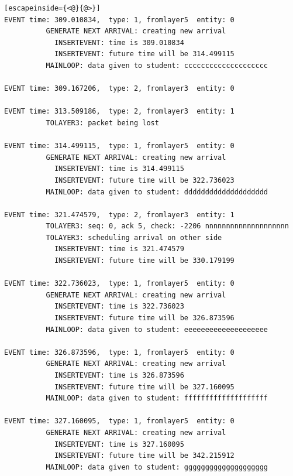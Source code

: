 \documentclass[paper=a4, fontsize=11pt]{scrartcl}
\numberwithin{equation}{section}		%
\numberwithin{figure}{section}			%
\numberwithin{table}{section}				%
\begin{document}
\begin{lstlisting}[escapeinside={<@}{@>}]
EVENT time: 309.010834,  type: 1, fromlayer5  entity: 0
          GENERATE NEXT ARRIVAL: creating new arrival
            INSERTEVENT: time is 309.010834
            INSERTEVENT: future time will be 314.499115
          MAINLOOP: data given to student: cccccccccccccccccccc

EVENT time: 309.167206,  type: 2, fromlayer3  entity: 0

EVENT time: 313.509186,  type: 2, fromlayer3  entity: 1
          TOLAYER3: packet being lost

EVENT time: 314.499115,  type: 1, fromlayer5  entity: 0
          GENERATE NEXT ARRIVAL: creating new arrival
            INSERTEVENT: time is 314.499115
            INSERTEVENT: future time will be 322.736023
          MAINLOOP: data given to student: dddddddddddddddddddd

EVENT time: 321.474579,  type: 2, fromlayer3  entity: 1
          TOLAYER3: seq: 0, ack 5, check: -2206 nnnnnnnnnnnnnnnnnnnn
          TOLAYER3: scheduling arrival on other side
            INSERTEVENT: time is 321.474579
            INSERTEVENT: future time will be 330.179199

EVENT time: 322.736023,  type: 1, fromlayer5  entity: 0
          GENERATE NEXT ARRIVAL: creating new arrival
            INSERTEVENT: time is 322.736023
            INSERTEVENT: future time will be 326.873596
          MAINLOOP: data given to student: eeeeeeeeeeeeeeeeeeee

EVENT time: 326.873596,  type: 1, fromlayer5  entity: 0
          GENERATE NEXT ARRIVAL: creating new arrival
            INSERTEVENT: time is 326.873596
            INSERTEVENT: future time will be 327.160095
          MAINLOOP: data given to student: ffffffffffffffffffff

EVENT time: 327.160095,  type: 1, fromlayer5  entity: 0
          GENERATE NEXT ARRIVAL: creating new arrival
            INSERTEVENT: time is 327.160095
            INSERTEVENT: future time will be 342.215912
          MAINLOOP: data given to student: gggggggggggggggggggg


\end{lstlisting}
\end{document}
